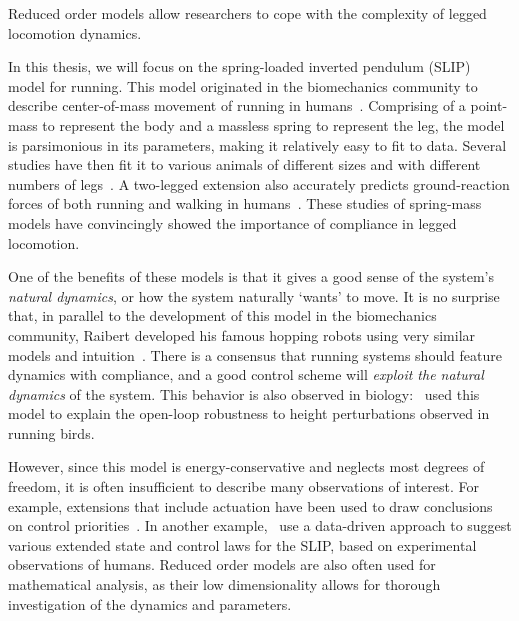 Reduced order models allow researchers to cope with the complexity of legged locomotion dynamics. \par
In this thesis, we will focus on the spring-loaded inverted pendulum (SLIP) model for running. This model originated in the biomechanics community to describe center-of-mass movement of running in humans~\cite{blickhan1989spring}. Comprising of a point-mass to represent the body and a massless spring to represent the leg, the model is parsimonious in its parameters, making it relatively easy to fit to data.
Several studies have then fit it to various animals of different sizes and with different numbers of legs~\cite{blickhan1993similarity,daley2006running,jindrich2002dynamic}. A two-legged extension also accurately predicts ground-reaction forces of both running and walking in humans~\cite{geyer2006compliant}. These studies of spring-mass models have convincingly showed the importance of compliance in legged locomotion. \par
One of the benefits of these models is that it gives a good sense of the system's \emph{natural dynamics}, or how the system naturally `wants' to move.
It is no surprise that, in parallel to the development of this model in the biomechanics community, Raibert developed his famous hopping robots using very similar models and intuition~\cite[see Figure 2.5]{raibert1986legged}.
There is a consensus that running systems should feature dynamics with compliance, and a good control scheme will \emph{exploit the natural dynamics} of the system.
This behavior is also observed in biology:~\textcite{daley2006running} used this model to explain the open-loop robustness to height perturbations observed in running birds. \par
However, since this model is energy-conservative and neglects most degrees of freedom, it is often insufficient to describe many observations of interest. For example, extensions that include actuation have been used to draw conclusions on control priorities~\cite{Birn-Jeffery3786,blum2014swing}. In another example,~\textcite{maus2015constructing} use a data-driven approach to suggest various extended state and control laws for the SLIP, based on experimental observations of humans. %
Reduced order models are also often used for mathematical analysis, as their low dimensionality allows for thorough investigation of the dynamics and parameters.

